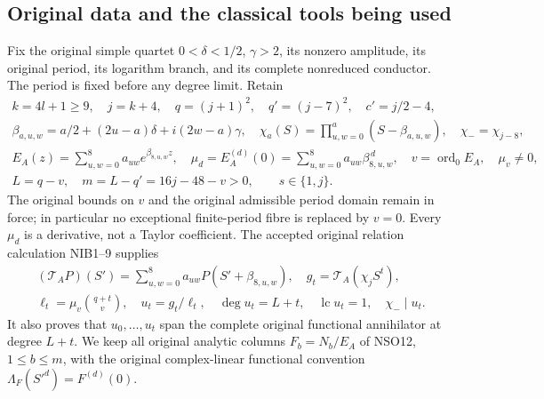 \documentclass[11pt,a4paper]{article}
\begin{document}
\subsection{Original data and the classical tools being used}
Fix the original simple quartet $0<\delta<1/2$, $\gamma>2$,
its nonzero amplitude, its original period, its logarithm branch,
and its complete nonreduced conductor. The period is fixed before
any degree limit. Retain
\[
\begin{gathered}
 k=4l+1\ge9,\quad j=k+4,\quad q=(j+1)^2,\quad q'=(j-7)^2,
 \quad c'=j/2-4,\\
 \beta_{a,u,w}=a/2+(2u-a)\delta+i(2w-a)\gamma,\quad
 \chi_a(S)=\prod_{u,w=0}^{a}(S-\beta_{a,u,w}),\quad
 \chi_-=\chi_{j-8},\\
 E_A(z)=\sum_{u,w=0}^{8}a_{uw}e^{\beta_{8,u,w}z},\quad
 \mu_d=E_A^{(d)}(0)=\sum_{u,w=0}^{8}a_{uw}\beta_{8,u,w}^{\,d},
 \quad v=\operatorname{ord}_0E_A,\quad\mu_v\ne0,\\
 L=q-v,\quad m=L-q'=16j-48-v>0,\qquad s\in\{1,j\}.
\end{gathered}                                                    \tag{NTG1}
\]
The original bounds on $v$ and the original admissible period
domain remain in force; in particular no exceptional finite-period
fibre is replaced by $v=0$. Every $\mu_d$ is a derivative,
not a Taylor coefficient. The accepted original relation
calculation NIB1--9 supplies
\[
\begin{gathered}
 (\mathcal T_AP)(S')=\sum_{u,w=0}^{8}a_{uw}P(S'+\beta_{8,u,w}),
 \quad g_t=\mathcal T_A(\chi_j S^t),\\
 \ell_t=\mu_v\binom{q+t}{v},\quad u_t=g_t/\ell_t,\quad
 \deg u_t=L+t,\quad\operatorname{lc}u_t=1,\quad \chi_-\mid u_t .
\end{gathered}                                                    \tag{NTG2}
\]
It also proves that $u_0,\ldots,u_t$ span the complete original
functional annihilator at degree $L+t$. We keep all original
analytic columns $F_b=N_b/E_A$ of NSO12, $1\le b\le m$, with
the original complex-linear functional convention
$\Lambda_F(S'^d)=F^{(d)}(0)$.
\end{document}

